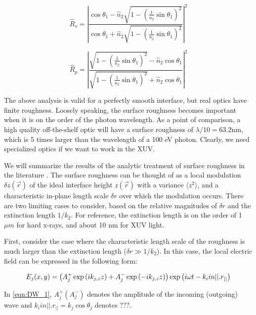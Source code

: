 \begin{equation}
\hat{R}_s = \left| \frac{\cos \theta_1 - \hat{n}_2 \sqrt{1-\left(\frac{1}{n_2}\sin \theta_1\right)^2}}{\cos \theta_1 + \hat{n}_2 \sqrt{1-\left(\frac{1}{n_2}\sin \theta_1\right)^2}} \right|^2
\label{eqn:Fresnel_Rs_2}
\end{equation}

\begin{equation}
\hat{R}_p = \left| \frac{\sqrt{1-\left(\frac{1}{n_2}\sin \theta_1\right)^2} - \hat{n}_2 \cos \theta_1}{\sqrt{1-\left(\frac{1}{n_2}\sin \theta_1\right)^2} + \hat{n}_2 \cos \theta_1} \right|^2
\label{eqn:Fresnel_Rp_2}
\end{equation}

The above analysis is valid for a perfectly smooth interface, but real optics have finite roughness. Loosely speaking, the surface roughness becomes important when it is on the order of the photon wavelength. As a point of comparison, a high quality off-the-shelf optic will have a surface roughness of $\lambda/10 = 63.2 \text{nm}$, which is 5 times larger than the wavelength of a 100 eV photon. Clearly, we need specialized optics if we want to work in the XUV.

We will summarize the results of the analytic treatment of surface roughness in the literature \cite{sentenacStatisticalAspectsWave2009, gibaudSpecularReflectivitySmooth2009}. The surface roughness can be thought of as a local modulation $\delta z(\vec{r})$ of the ideal interface height $z(\vec{r})$ with a variance $\langle z^2 \rangle$, and a characteristic in-plane length scale $\delta r$ over which the modulation occurs. There are two limiting cases to consider, based on the relative magnitudes of $\delta r$ and the extinction length $1/k_2$. For reference, the extinction length is on the order of 1 $\mu m$ for hard x-rays, and about 10 nm for XUV light.

First, consider the case where the characteristic length scale of the roughness is much larger than the extinction length ($\delta r \gg 1/k_2$). In this case, the local electric field can be expressed in the following form:

\begin{equation}
E_j (x,y) = \left( A_j^+ \exp \left(i k_{j,z} z \right) +  A_j^- \exp \left( - i k_{j,z} z \right)  \right) \exp \left( i \omega t - \boldmath{k}_i in||.\boldmath{r_{||}} \right)
\label{eqn:DW_1}
\end{equation}

In \cref{eqn:DW_1}, $A_j^+ (A_j^-)$ denotes the amplitude of the incoming (outgoing) wave and $k_i in ||.r_{||} = k_j \cos \theta_j$ denotes ???.

